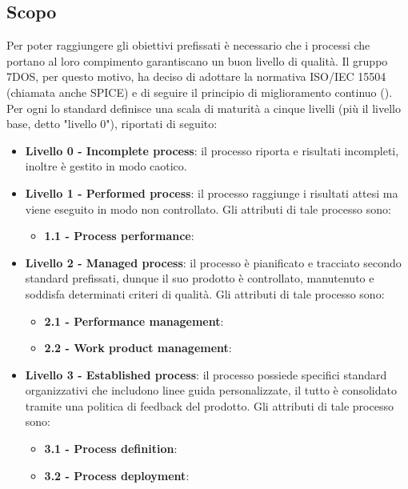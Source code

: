 
\subsection{Scopo}
	Per poter raggiungere gli obiettivi prefissati è necessario che i processi che portano al loro compimento garantiscano un buon livello  	di qualità. Il gruppo 7DOS, per questo motivo, ha deciso di adottare la normativa ISO/IEC 15504 (chiamata anche SPICE) e di 	seguire il principio di miglioramento continuo (). \\ Per ogni  lo standard definisce una scala di maturità a cinque livelli (più il livello base, detto "livello 0"), riportati di seguito:
	
	\begin{itemize}
	\item \textbf {Livello 0 - Incomplete process}: il processo riporta  e risultati incompleti, inoltre è gestito in modo caotico.
	\item \textbf {Livello 1 - Performed process}:  il processo raggiunge i risultati attesi ma viene eseguito in modo non controllato. Gli attributi di tale processo sono:
		\begin{itemize}
		\item \textbf{1.1 - Process performance}:
		\end{itemize}
	\item \textbf {Livello 2 - Managed process}: il processo è pianificato e tracciato secondo standard prefissati, dunque il suo prodotto è controllato, manutenuto e soddisfa determinati criteri di qualità. Gli attributi di tale processo sono:
		\begin{itemize}
		\item \textbf{2.1 - Performance management}:
		\item \textbf{2.2 - Work product management}:
		\end{itemize}
	\item \textbf {Livello 3 - Established process}: il processo possiede specifici standard organizzativi che includono linee guida personalizzate, il tutto è consolidato tramite una politica di feedback del prodotto. Gli attributi di tale processo sono:
		\begin{itemize}
		\item \textbf{3.1 - Process definition}:
		\item \textbf{3.2 - Process deployment}:
		\end{itemize}

\end{itemize}
